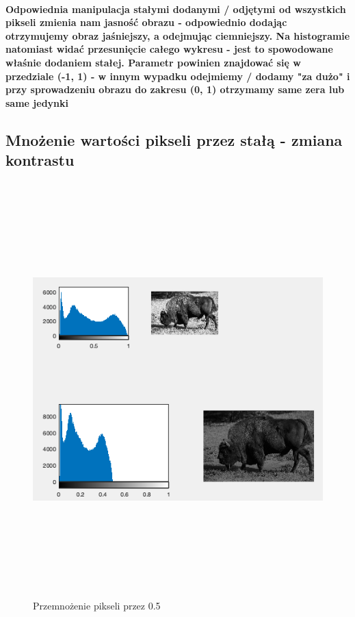 \documentclass[a4paper,12pt]{article}
\begin{document}
\begin{justify}
\paragraph{Odpowiednia manipulacja stałymi dodanymi / odjętymi od wszystkich pikseli zmienia nam jasność obrazu - odpowiednio dodając otrzymujemy obraz jaśniejszy, a odejmując ciemniejszy. Na histogramie natomiast widać przesunięcie całego wykresu - jest to spowodowane właśnie dodaniem stałej. Parametr powinien znajdować się w przedziale (-1, 1) - w innym wypadku odejmiemy / dodamy "za dużo" i przy sprowadzeniu obrazu do zakresu (0, 1) otrzymamy same zera lub same jedynki}

\subsection{Mnożenie wartości pikseli przez stałą - zmiana kontrastu}

\begin{figure}[h]
\centering
\includegraphics[width=18cm, height=16cm]{2}
\caption{Przemnożenie pikseli przez 0.5}
\end{figure}


\end{justify}
\end{document}
